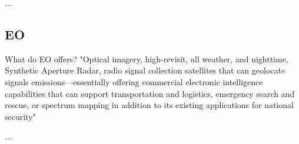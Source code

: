 ...

\bigskip
\subsection{EO}
\bigskip

What do EO offers? "Optical imagery, high-revisit, all weather, and nighttime, Synthetic Aperture Radar, radio signal collection satellites that can geolocate signals emissions—essentially offering commercial electronic intelligence capabilities that can support transportation and logistics, emergency search and rescue, or spectrum mapping in addition to its existing applications for national security"
\cite{Hallex}

...